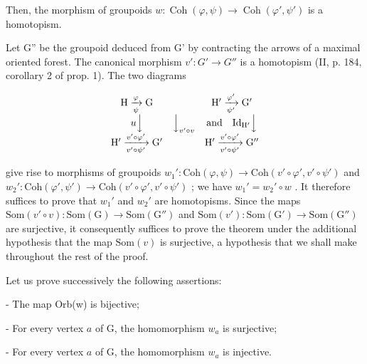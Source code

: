 Then, the morphism of groupoids \(w\colon \operatorname{Coh}(\varphi,\psi)\to\operatorname{Coh}(\varphi',\psi')\) is a homotopism.

Let G'' be the groupoid deduced from G' by contracting the arrows of a maximal oriented forest. The canonical morphism \(v'\colon G' \to G''\) is a homotopism (II, p. 184, corollary 2 of prop. 1). The two diagrams

\[
\begin{array}{c c c} \mathrm{H} \xrightarrow [ \psi ]{\varphi} \mathrm{G} & & \mathrm{H} ^ {\prime} \xrightarrow [ \psi^ {\prime} ]{\varphi^ {\prime}} \mathrm{G} ^ {\prime} \\ u \Big \downarrow & \Big \downarrow_ {v ^ {\prime} \circ v} & \text {and} \quad \mathrm{Id} _ {\mathrm{H} ^ {\prime}} \Big \downarrow \\ \mathrm{H} ^ {\prime} \xrightarrow [ v ^ {\prime} \circ \psi^ {\prime} ]{v ^ {\prime} \circ \varphi^ {\prime}} \mathrm{G} ^ {\prime} & & \mathrm{H} ^ {\prime} \xrightarrow [ v ^ {\prime} \circ \psi^ {\prime} ]{v ^ {\prime} \circ \varphi^ {\prime}} \mathrm{G} ^ {\prime \prime} \end{array}
\]

give rise to morphisms of groupoids \(w_1' \colon \mathrm{Coh}(\varphi, \psi) \to \mathrm{Coh}(v' \circ \varphi', v' \circ \psi')\) and \(w_2' \colon \mathrm{Coh}(\varphi', \psi') \to \mathrm{Coh}(v' \circ \varphi', v' \circ \psi')\) ; we have \(w_1' = w_2' \circ w\) . It therefore suffices to prove that \(w_1'\) and \(w_2'\) are homotopisms. Since the maps \(\mathrm{Som}(v' \circ v) \colon \mathrm{Som}(\mathrm{G}) \to \mathrm{Som}(\mathrm{G}'' )\) and \(\mathrm{Som}(v') \colon \mathrm{Som}(\mathrm{G}') \to \mathrm{Som}(\mathrm{G}'' )\) are surjective, it consequently suffices to prove the theorem under the additional hypothesis that the map \(\mathrm{Som}(v)\) is surjective, a hypothesis that we shall make throughout the rest of the proof.

Let us prove successively the following assertions:

- The map Orb(w) is bijective;

- For every vertex \(a\) of G, the homomorphism \(w_{a}\) is surjective;

- For every vertex \(a\) of G, the homomorphism \(w_{a}\) is injective.

